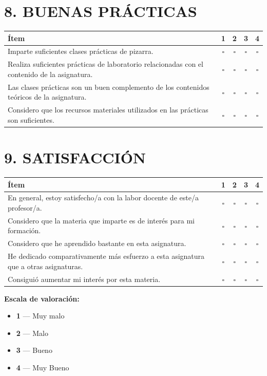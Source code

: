 \documentclass[12pt,a4paper]{article}
\begin{document}
\vspace{1em}

\section*{8. BUENAS PRÁCTICAS}

\begin{tabularx}{\textwidth}{Xcccc}
\toprule
\rowcolor{headerblue}
\textbf{Ítem} & \textbf{1} & \textbf{2} & \textbf{3} & \textbf{4} \\
\midrule
Imparte suficientes clases prácticas de pizarra. & $\square$ & $\square$ & $\square$ & $\square$ \\[6pt]
Realiza suficientes prácticas de laboratorio relacionadas con el contenido de la asignatura. & $\square$ & $\square$ & $\square$ & $\square$ \\[6pt]
Las clases prácticas son un buen complemento de los contenidos teóricos de la asignatura. & $\square$ & $\square$ & $\square$ & $\square$ \\[6pt]
Considero que los recursos materiales utilizados en las prácticas son suficientes. & $\square$ & $\square$ & $\square$ & $\square$ \\
\bottomrule
\end{tabularx}

\vspace{1em}

\section*{9. SATISFACCIÓN}

\begin{tabularx}{\textwidth}{Xcccc}
\toprule
\rowcolor{headerblue}
\textbf{Ítem} & \textbf{1} & \textbf{2} & \textbf{3} & \textbf{4} \\
\midrule
En general, estoy satisfecho/a con la labor docente de este/a profesor/a. & $\square$ & $\square$ & $\square$ & $\square$ \\[6pt]
Considero que la materia que imparte es de interés para mi formación. & $\square$ & $\square$ & $\square$ & $\square$ \\[6pt]
Considero que he aprendido bastante en esta asignatura. & $\square$ & $\square$ & $\square$ & $\square$ \\[6pt]
He dedicado comparativamente más esfuerzo a esta asignatura que a otras asignaturas. & $\square$ & $\square$ & $\square$ & $\square$ \\[6pt]
Consiguió aumentar mi interés por esta materia. & $\square$ & $\square$ & $\square$ & $\square$ \\
\bottomrule
\end{tabularx}

\vspace{1.5em}

\noindent\textbf{Escala de valoración:}
\begin{itemize}[noitemsep]
    \item \textbf{1} --- Muy malo
    \item \textbf{2} --- Malo
    \item \textbf{3} --- Bueno
    \item \textbf{4} --- Muy Bueno
\end{itemize}
\end{document}
